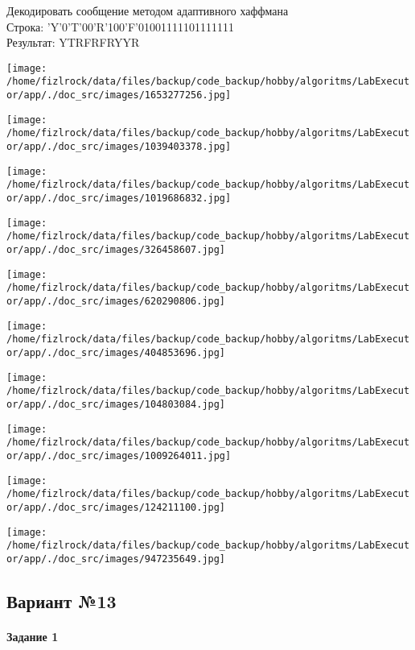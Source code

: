 \documentclass[a4paper, 12pt]{article}
\begin{document}
Декодировать сообщение методом адаптивного хаффмана \\
Строка: 
'Y'0'T'00'R'100'F'01001111101111111\\
Результат: YTRFRFRYYR

\texttt{[image: /home/fizlrock/data/files/backup/code\_backup/hobby/algoritms/LabExecutor/app/./doc\_src/images/1653277256.jpg]}

\texttt{[image: /home/fizlrock/data/files/backup/code\_backup/hobby/algoritms/LabExecutor/app/./doc\_src/images/1039403378.jpg]}

\texttt{[image: /home/fizlrock/data/files/backup/code\_backup/hobby/algoritms/LabExecutor/app/./doc\_src/images/1019686832.jpg]}

\texttt{[image: /home/fizlrock/data/files/backup/code\_backup/hobby/algoritms/LabExecutor/app/./doc\_src/images/326458607.jpg]}

\texttt{[image: /home/fizlrock/data/files/backup/code\_backup/hobby/algoritms/LabExecutor/app/./doc\_src/images/620290806.jpg]}

\texttt{[image: /home/fizlrock/data/files/backup/code\_backup/hobby/algoritms/LabExecutor/app/./doc\_src/images/404853696.jpg]}

\texttt{[image: /home/fizlrock/data/files/backup/code\_backup/hobby/algoritms/LabExecutor/app/./doc\_src/images/104803084.jpg]}

\texttt{[image: /home/fizlrock/data/files/backup/code\_backup/hobby/algoritms/LabExecutor/app/./doc\_src/images/1009264011.jpg]}

\texttt{[image: /home/fizlrock/data/files/backup/code\_backup/hobby/algoritms/LabExecutor/app/./doc\_src/images/124211100.jpg]}

\texttt{[image: /home/fizlrock/data/files/backup/code\_backup/hobby/algoritms/LabExecutor/app/./doc\_src/images/947235649.jpg]}
\pagebreak
\subsection{Вариант №13}
\paragraph{Задание 1}
\end{document}
